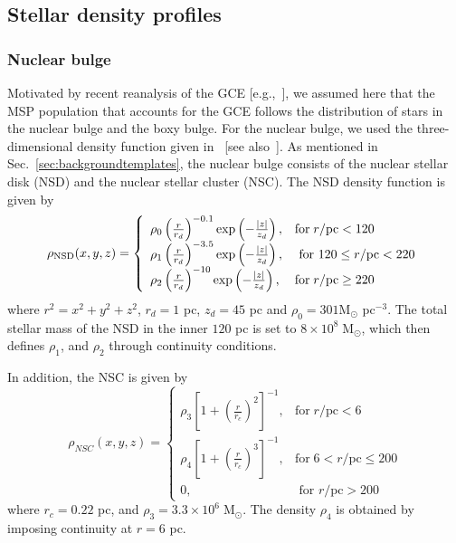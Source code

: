 \documentclass[doublespace,draft,nopageskip]{VTthesis} %
\begin{document}
\begin{appendices}
\chapter{} \label{B}
  \section{Stellar density profiles}
\label{appdx:Stellardensity}

\subsection{Nuclear bulge}
Motivated by recent reanalysis of the GCE [e.g.,~\cite{Macias:2019omb}], we assumed here that the MSP population that accounts for the GCE follows the distribution of stars in the nuclear bulge and the boxy bulge. For the nuclear bulge, we used the three-dimensional density function given in~\cite{Launhardt:2002tx} [see also~\cite{Song:2019nrx}]. As mentioned in Sec.~\ref{sec:backgroundtemplates}, the nuclear bulge consists of the nuclear stellar disk (NSD) and the nuclear stellar cluster (NSC). The NSD density function is given by
\begin{equation}\label{eq:NSD}
\rho_{\rm NSD}(x, y, z)=\left\{\begin{array}{ll}\rho_{0}\left(\frac{r}{r_{d}}\right)^{-0.1} \exp \left(-\frac{|z|}{z_{d}}\right), & \textrm{for}\; r / \mathrm{pc}<120 \\ \rho_{1}\left(\frac{r}{r_{d}}\right)^{-3.5} \exp \left(-\frac{|z|}{z_{d}}\right), & \textrm{ for } 120 \leq r / \mathrm{pc}<220 \\ \rho_{2}\left(\frac{r}{r_{d}}\right)^{-10} \exp \left(-\frac{|z|}{z_{d}}\right), & \textrm{for}\; r / \mathrm{pc} \geq 220 \end{array}\right.    
\end{equation} 
where $r^2=x^2+y^2+z^2$, $r_{d}=1$ pc, $z_{d}=45$ pc and $\rho_{0}=301 \mathrm{M}_{\odot}$ pc$^{-3}$. The total stellar mass of the NSD in the inner $120$ pc is set to $8 \times 10^{8}\;\mathrm{M}_{\odot}$, which then defines $\rho_{1}$, and $\rho_{2}$ through continuity conditions. 

In addition, the NSC is given by
\begin{equation}\label{eq:NSC}
    \rho_{N S C}(x, y, z)=\left\{\begin{array}{ll}\rho_{3}\left[1+\left(\frac{r}{r_{c}}\right)^{2}\right]^{-1}, & \textrm{for}\; r / \mathrm{pc}<6 \\ \rho_{4}\left[1+\left(\frac{r}{r_{c}}\right)^{3}\right]^{-1}, & \textrm{for}\; 6<r / \mathrm{pc} \leq 200 \\ 0, & \text { for } r / \mathrm{pc}>200\end{array}\right.
\end{equation}
where $r_c= 0.22$ pc, and  $\rho_3 = 3.3 \times 10^6 \; \mathrm{M}_{\odot}$. The density $\rho_4$ is obtained by imposing continuity at $r=6$ pc.


\end{appendices}
\end{document}
